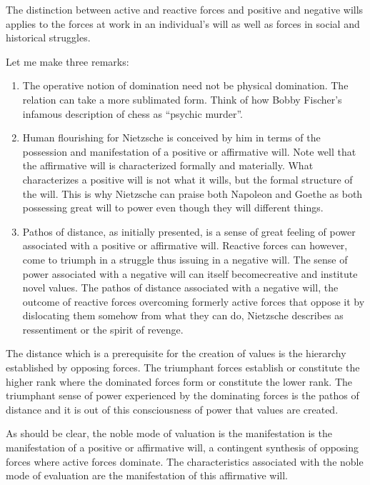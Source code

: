 The distinction between active and reactive forces and positive and negative wills applies to the forces at work in an individual's will as well as forces in social and historical struggles. 

Let me make three remarks:

\begin{enumerate}
	\item The operative notion of domination need not be physical domination. The relation can take a more sublimated form. Think of how Bobby Fischer's infamous description of chess as ``psychic murder''.
	\item Human flourishing for Nietzsche is conceived by him in terms of the possession and manifestation of a positive or affirmative will. Note well that the affirmative will is characterized formally and materially. What characterizes a positive will is not what it wills, but the formal structure of the will. This is why Nietzsche can praise both Napoleon and Goethe as both possessing great will to power even though they will different things.
	\item Pathos of distance, as initially presented, is a sense of great feeling of power associated with a positive or affirmative will. Reactive forces can however, come to triumph in a struggle thus issuing in a negative will. The sense of power associated with a negative will can itself becomecreative and institute novel values. The pathos of distance associated with a negative will, the outcome of reactive forces overcoming formerly active forces that oppose it by dislocating them somehow from what they can do, Nietzsche describes as ressentiment or the spirit of revenge.
\end{enumerate}

\change

The distance which is a prerequisite for the creation of values is the hierarchy established by opposing forces. The triumphant forces establish or constitute the higher rank where the dominated forces form or constitute the lower rank. The triumphant sense of power experienced by the dominating forces is the pathos of distance and it is out of this consciousness of power that values are created.

As should be clear, the noble mode of valuation is the manifestation is the manifestation of a positive or affirmative will, a contingent synthesis of opposing forces where active forces dominate. The characteristics associated with the noble mode of evaluation are the manifestation of this affirmative will.

